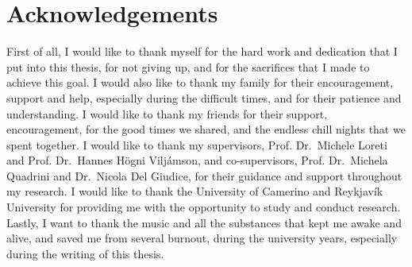 \chapter*{Acknowledgements}
First of all, I would like to thank myself for the hard work and dedication that I put into this thesis, for not giving up, and for the sacrifices that I made to achieve this goal.
I would also like to thank my family for their encouragement, support and help, especially during the difficult times, and for their patience and understanding.
I would like to thank my friends for their support, encouragement, for the good times we shared, and the endless chill nights that we spent together.
I would like to thank my supervisors, Prof. Dr.~Michele Loreti and Prof. Dr.~Hannes H\"ogni Vilj\'amson, and co-supervisors, Prof. Dr.~Michela Quadrini and Dr.~Nicola Del Giudice, for their guidance and support throughout my research.
I would like to thank the University of Camerino and Reykjav\'ik University for providing me with the opportunity to study and conduct research.
Lastly, I want to thank the music and all the substances that kept me awake and alive, and saved me from several burnout, during the university years, especially during the writing of this thesis.
